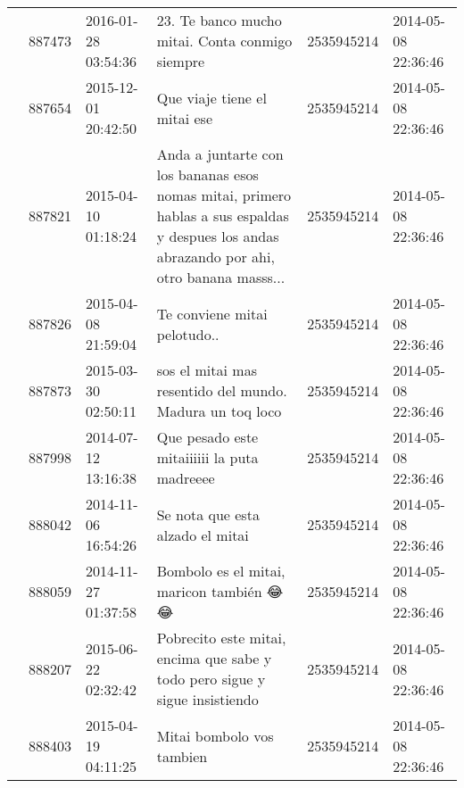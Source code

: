 \begin{tabular}{llllrl}
           & 887473  & 2016-01-28 03:54:36 &                                                                                              23. Te banco mucho mitai. Conta conmigo siempre &  2535945214 & 2014-05-08 22:36:46 \\
           & 887654  & 2015-12-01 20:42:50 &                                                                                                                 Que viaje tiene el mitai ese &  2535945214 & 2014-05-08 22:36:46 \\
           & 887821  & 2015-04-10 01:18:24 &  Anda a juntarte con los bananas esos nomas mitai, primero hablas a sus espaldas y despues los andas abrazando por ahi, otro banana masss... &  2535945214 & 2014-05-08 22:36:46 \\
           & 887826  & 2015-04-08 21:59:04 &                                                                                                                 Te conviene mitai pelotudo.. &  2535945214 & 2014-05-08 22:36:46 \\
           & 887873  & 2015-03-30 02:50:11 &                                                                                     sos el mitai mas resentido del mundo. Madura un toq loco &  2535945214 & 2014-05-08 22:36:46 \\
           & 887998  & 2014-07-12 13:16:38 &                                                                                                  Que pesado este mitaiiiiii la puta madreeee &  2535945214 & 2014-05-08 22:36:46 \\
           & 888042  & 2014-11-06 16:54:26 &                                                                                                             Se nota que esta alzado el mitai &  2535945214 & 2014-05-08 22:36:46 \\
           & 888059  & 2014-11-27 01:37:58 &                                                                                                      Bombolo es el mitai, maricon también 😂😂 &  2535945214 & 2014-05-08 22:36:46 \\
           & 888207  & 2015-06-22 02:32:42 &                                                                  Pobrecito este mitai, encima que sabe y todo pero sigue y sigue insistiendo &  2535945214 & 2014-05-08 22:36:46 \\
           & 888403  & 2015-04-19 04:11:25 &                                                                                                                    Mitai bombolo vos tambien &  2535945214 & 2014-05-08 22:36:46 \\

\end{tabular}
